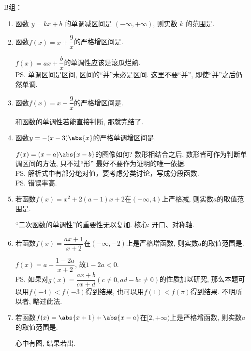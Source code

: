 B组：
\begin{enumerate}
\item 函数 $y=k x+b$ 的单调减区间是 $(-\infty,+\infty)$, 则实数 $k$ 的范围是\blkda{$(-\infty, 0]$}. 

\item 函数$f(x)=x+\dfrac{9}{x}$的严格增区间是\blkda[4]{$(-\infty,-3]$和$[3,+\infty)$}. 
\begin{jieda}
$f(x)=ax+\dfrac{b}{x}$的单调性应该是滚瓜烂熟. \\
\ps 单调区间是区间, 区间的``并''未必是区间. 这里不要``并'', 即使``并''之后仍然单调. 
\end{jieda}


\item 函数$f(x)=x-\dfrac{9}{x}$的严格增区间是. 
\begin{jieda}
和函数的单调性若能直接判断, 那就完结了. 
\end{jieda}


\item 函数$y=-(x-3)\abs{x}$的严格单调增区间是\blkda{$[0,\frac{3}{2}]$}. 
\begin{jieda}
$f(x)=(x-a)\abs{x-b}$的图像如何? 数形相结合之后, 数形皆可作为判断单调区间的方法, 只不过``形'' 最好不要作为证明的唯一依据. \\
\ps 解析式中有部分绝对值，要考虑分类讨论，写成分段函数.\\
\ps 错误率高.
\end{jieda}

\item 若函数$f(x)=x^2+2(a-1)x+2$在$(-\infty,4)$上严格减, 则实数$a$的取值范围是. 
\begin{jieda}
``二次函数的单调性''的重要性无以复加. 核心: 开口、对称轴. 
\end{jieda}

\item 若函数$f(x)=\dfrac{ax+1}{x+2}$在$(-\infty,-2)$上是严格增函数, 则实数$a$的取值范围是. 
\begin{jieda}
$f(x)=a+\dfrac{1-2a}{x+2}$, 故$1-2a<0$. \\
\ps 如果对$g(x)=\dfrac{ax+b}{cx+d}(c\neq 0, ad-bc\neq 0)$的性质加以研究, 那么本题可以用$f(-4)<f(-3)$得到结果, 也可以用$f(1)<f(\pi)$得到结果. 不明所以者, 略过此法. 
\end{jieda}

\item 若函数$f(x)=\abs{x+1}+\abs{x-a}$在$[2,+\infty)$上是严格增函数, 则实数$a$的取值范围是.
\begin{jieda}
心中有图, 结果若出. 
\end{jieda}


\end{enumerate}

